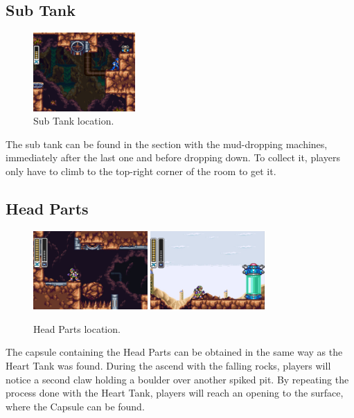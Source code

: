\subsection{Sub Tank}
\begin{figure}[htp]
	\centering
	\includegraphics[height=3cm]{figures/X3/Tunnel_rhino/tank.jpg}
	\caption{Sub Tank location.}
\end{figure}
The sub tank can be found in the section with the mud-dropping machines, immediately after the last one and before dropping down. To collect it, players only have to climb to the top-right corner of the room to get it.

\subsection{Head Parts}
\begin{figure}[htp]
	\centering
	\includegraphics[height=3cm]{figures/X3/Tunnel_rhino/Armor_1.png}
	\includegraphics[height=3cm]{figures/X3/Tunnel_rhino/Armor_2.png}
	\caption{Head Parts location.}
\end{figure}
The capsule containing the Head Parts can be obtained in the same way as the Heart Tank was found. During the ascend with the falling rocks, players will notice a second claw holding a boulder over another spiked pit. By repeating the process done with the Heart Tank, players will reach an opening to the surface, where the Capsule can be found.


